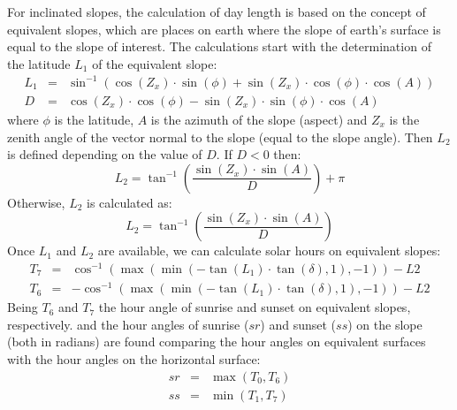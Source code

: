 \documentclass[11pt,a4paper]{article}
\begin{document}
For inclinated slopes, the calculation of day length is based on the concept of equivalent slopes, which are places on earth where the slope of earth's surface is equal to the slope of interest. The calculations start with the determination of the latitude $L_1$ of the equivalent slope:
\begin{eqnarray}
  L_1 &=& \sin^{-1}\left(\cos(Z_x)\cdot \sin(\phi)+\sin(Z_x) \cdot \cos(\phi) \cdot \cos(A)\right) \\
  D &=& \cos(Z_x) \cdot \cos(\phi)-\sin(Z_x) \cdot \sin(\phi) \cdot \cos(A)
\end{eqnarray}
where $\phi$ is the latitude, $A$ is the azimuth of the slope (aspect) and $Z_x$ is the zenith angle of the vector normal to the slope (equal to the slope angle). Then $L_2$ is defined depending on the value of $D$. If $D < 0$ then:
\begin{equation}
  L_2 = \tan^{-1}\left(\frac{\sin(Z_x) \cdot \sin(A)}{D}\right)+\pi
\end{equation}
Otherwise, $L_2$ is calculated as:
\begin{equation}
L_2 =  \tan^{-1}\left(\frac{\sin(Z_x) \cdot \sin(A)}{D}\right)
\end{equation}
Once $L_1$ and $L_2$ are available, we can calculate solar hours on equivalent slopes:
\begin{eqnarray}
  T_7 &=& \cos^{-1}\left(\max(\min(-\tan(L_1) \cdot \tan(\delta), 1),-1)\right)-L2 \\ 
  T_6 &=& - \cos^{-1}\left(\max(\min(-\tan(L_1) \cdot \tan(\delta), 1),-1)\right) -L2 
\end{eqnarray}
Being $T_6$ and $T_7$ the hour angle of sunrise and sunset on equivalent slopes, respectively. 
and the hour angles of sunrise ($sr$) and sunset ($ss$) on the slope (both in radians) are found comparing the hour angles on equivalent surfaces with the hour angles on the horizontal surface:
\begin{eqnarray}
  sr &=& \max(T_0,T_6) \\
  ss &=& \min(T_1,T_7)
\end{eqnarray}
\end{document}
